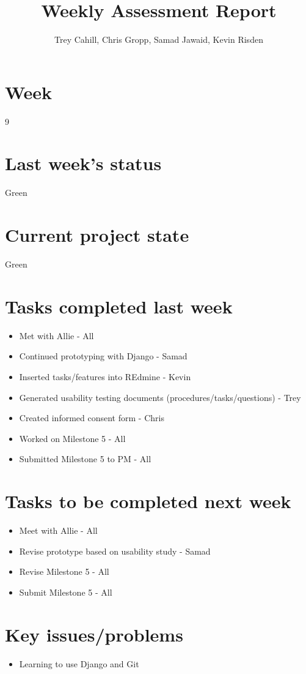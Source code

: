 \documentclass{article}
\title{Weekly Assessment Report}
\author{Trey Cahill, Chris Gropp, Samad Jawaid, Kevin Risden}
\begin{document}
\maketitle
\section{Week}
9
\section{Last week's status}
Green
\section{Current project state}
Green
\section{Tasks completed last week}
\begin{itemize}
\item Met with Allie - All
\item Continued prototyping with Django - Samad
\item Inserted tasks/features into REdmine - Kevin
\item Generated usability testing documents (procedures/tasks/questions) - Trey
\item Created informed consent form - Chris
\item Worked on Milestone 5 - All
\item Submitted Milestone 5 to PM - All
\end{itemize}
\section{Tasks to be completed next week}
\begin{itemize}
\item Meet with Allie - All
\item Revise prototype based on usability study - Samad
\item Revise Milestone 5 - All
\item Submit Milestone 5 - All
\end{itemize}
\section{Key issues/problems}
\begin{itemize}
\item Learning to use Django and Git
\end{itemize}
\end{document}
